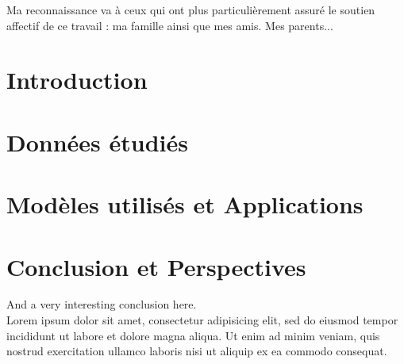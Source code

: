 \documentclass[a4paper, oneside, 12pt, final]{extreport}
\renewcommand{\contentsname}{Table des matières}
\begin{document}

Ma reconnaissance va à ceux qui ont plus particulièrement assuré le soutien affectif de ce travail : ma famille ainsi que mes amis. Mes parents...




\tableofcontents

\listoffigures
\listoftables
\listofalgorithms
{}
\cleardoublepage

\newpage
{}
\chapter*{Introduction}
\label{chap:general_intorduction}



\chapter{Données étudiés}%
\label{chap:chapterone}


\chapter{Modèles utilisés et Applications}
\label{chap:2}



\chapter*{Conclusion et Perspectives}
\label{chap:conclusion}
%
And a very interesting conclusion here\@. ~\\
Lorem ipsum dolor sit amet, consectetur adipisicing elit, sed do eiusmod
tempor incididunt ut labore et dolore magna aliqua. Ut enim ad minim veniam,
quis nostrud exercitation ullamco laboris nisi ut aliquip ex ea commodo
consequat.
\end{document}
